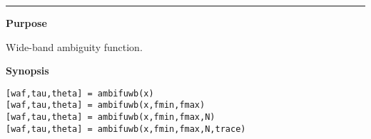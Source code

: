 

\hspace*{-1.6cm}{\Large \bf ambifuwb}

\vspace*{-.4cm}
\hspace*{-1.6cm}\rule[0in]{16.5cm}{.02cm}
\vspace*{.2cm}



{\bf \large {}\selectfont Purpose}\\
\hspace*{1.5cm}
\begin{minipage}[t]{13.5cm}
Wide-band ambiguity function.
\end{minipage}
\vspace*{.5cm}


{\bf \large {}\selectfont Synopsis}\\
\hspace*{1.5cm}
\begin{minipage}[t]{13.5cm}
\begin{verbatim}
[waf,tau,theta] = ambifuwb(x)
[waf,tau,theta] = ambifuwb(x,fmin,fmax)
[waf,tau,theta] = ambifuwb(x,fmin,fmax,N)
[waf,tau,theta] = ambifuwb(x,fmin,fmax,N,trace)
\end{verbatim}
\end{minipage}
\vspace*{.5cm}


